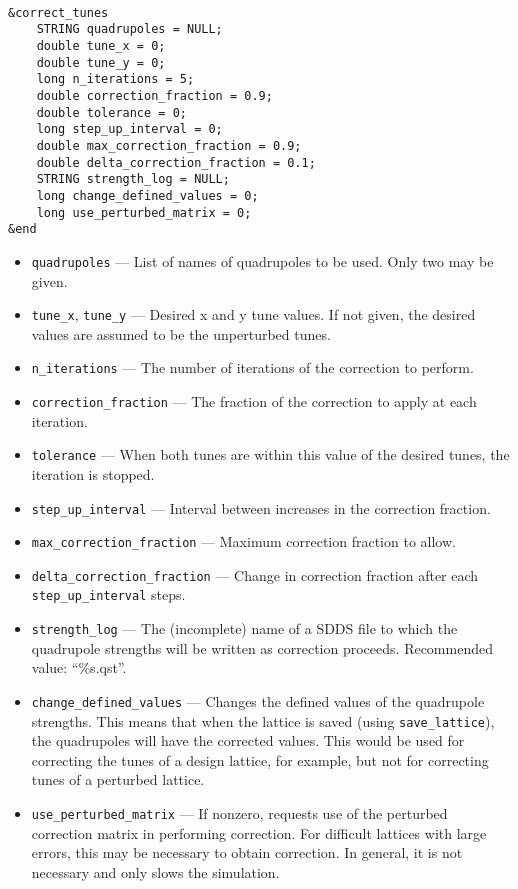 \documentclass[11pt]{article}
\begin{document}
\begin{verbatim}

&correct_tunes
    STRING quadrupoles = NULL;
    double tune_x = 0;
    double tune_y = 0;
    long n_iterations = 5;
    double correction_fraction = 0.9;
    double tolerance = 0;
    long step_up_interval = 0;
    double max_correction_fraction = 0.9;
    double delta_correction_fraction = 0.1;
    STRING strength_log = NULL;
    long change_defined_values = 0;
    long use_perturbed_matrix = 0;
&end
\end{verbatim}

\begin{itemize}
\item \verb|quadrupoles| --- List of names of quadrupoles to be used.  Only two may be given.
\item \verb|tune_x|, \verb|tune_y| --- Desired x and y tune values.  If not given, the desired values are
assumed to be the unperturbed tunes.
\item \verb|n_iterations| --- The number of iterations of the correction to perform.
\item \verb|correction_fraction| --- The fraction of the correction to apply at each iteration.
\item \verb|tolerance| --- When both tunes are within this value of the desired tunes, the
iteration is stopped.
\item \verb|step_up_interval| --- Interval between increases in the correction fraction.
\item \verb|max_correction_fraction| --- Maximum correction fraction to allow.
\item \verb|delta_correction_fraction| --- Change in correction fraction after 
each \verb|step_up_interval| steps.
\item \verb|strength_log| --- The (incomplete) name of a SDDS file to which the quadrupole 
strengths will be written as correction proceeds.  Recommended value: ``\%s.qst''.
\item \verb|change_defined_values| --- Changes the defined values of the quadrupole strengths.
This means that when the lattice is saved (using \verb|save_lattice|), the quadrupoles will
have the corrected values.  This would be used for correcting the tunes of a design
lattice, for example, but not for correcting tunes of a perturbed lattice.
\item \verb|use_perturbed_matrix| --- If nonzero, requests use of the perturbed correction matrix in
performing correction.  For difficult lattices with large errors, this may be necessary
to obtain correction.  In general, it is not necessary and only slows the simulation.
\end{itemize}
\end{document}
